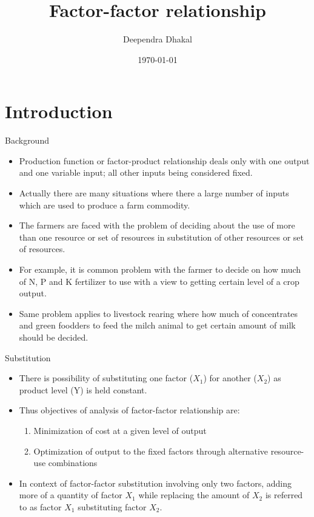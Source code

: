 \documentclass[12pt,ignorenonframetext,aspectratio=169]{beamer}
\title{\insertsectionhead}
  {
    \definecolor{white}{rgb}{0.776,0.357,0.157}
    \definecolor{iqss@orange}{rgb}{1,1,1}
    \ifnum \insertmainframenumber > \insertframenumber
    \frame{
      \frametitle{\iqsssectiontitleheader}
      \tableofcontents[currentsection]
    }
    \else
    \frame{
      \frametitle{Backup Slides}
      \tableofcontents[sectionstyle=shaded/shaded,subsectionstyle=shaded/shaded/shaded]
    }
    \fi
  }
\title[]{Factor-factor relationship}
\author[
        Deependra Dhakal
    ]{Deependra Dhakal}
\institute[
    ]{
    GAASC, Baitadi \and Tribhuwan University
    }
\date[
      \today
  ]{
      \today
        }
\providecommand{\tightlist}{%
  \setlength{\itemsep}{0pt}\setlength{\parskip}{0pt}}
\begin{document}
  \begin{frame}[plain]
  \titlepage
  \end{frame}



\hypertarget{introduction}{%
\section{Introduction}\label{introduction}}

\begin{frame}{Background}
\protect\hypertarget{background}{}
\begin{itemize}
\tightlist
\item
  Production function or factor-product relationship deals only with one
  output and one variable input; all other inputs being considered
  fixed.
\item
  Actually there are many situations where there a large number of
  inputs which are used to produce a farm commodity.
\item
  The farmers are faced with the problem of deciding about the use of
  more than one resource or set of resources in substitution of other
  resources or set of resources.
\item
  For example, it is common problem with the farmer to decide on how
  much of N, P and K fertilizer to use with a view to getting certain
  level of a crop output.
\item
  Same problem applies to livestock rearing where how much of
  concentrates and green foodders to feed the milch animal to get
  certain amount of milk should be decided.
\end{itemize}
\end{frame}

\begin{frame}{Substitution}
\protect\hypertarget{substitution}{}
\begin{itemize}
\tightlist
\item
  There is possibility of substituting one factor (\(X_1\)) for another
  (\(X_2\)) as product level (Y) is held constant.
\item
  Thus objectives of analysis of factor-factor relationship are:

  \begin{enumerate}
  \tightlist
  \item
    Minimization of cost at a given level of output
  \item
    Optimization of output to the fixed factors through alternative
    resource-use combinations
  \end{enumerate}
\item
  In context of factor-factor substitution involving only two factors,
  adding more of a quantity of factor \(X_1\) while replacing the amount
  of \(X_2\) is referred to as factor \(X_1\) substituting factor
  \(X_2\).
\end{itemize}
\end{frame}
\end{document}
